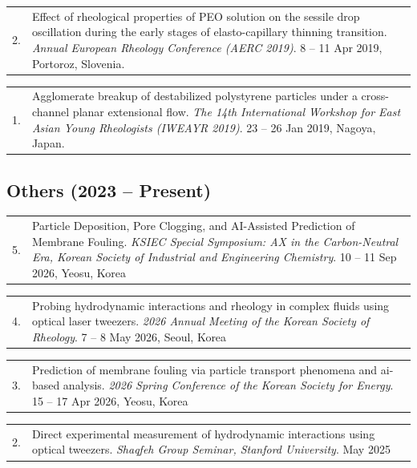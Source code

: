 \documentclass[11pt, a4paper]{article}
\makeatletter
\newenvironment{pubitem}[2]{%
  \begin{tabularx}{\textwidth}{@{}p{1cm}X@{}}
  #1 & #2 \\
  \end{tabularx}
}{}
\makeatother
\begin{document}
    \begin{pubitem}{2.}{Effect of rheological properties of PEO solution on the sessile drop oscillation during the early stages of elasto-capillary thinning transition. 
    \textit{Annual European Rheology Conference (AERC 2019)}. 8 – 11 Apr 2019, Portoroz, Slovenia.}
    \end{pubitem}
    
    \vspace{0.3em}
    
    \begin{pubitem}{1.}{Agglomerate breakup of destabilized polystyrene particles under a cross-channel planar extensional flow. 
    \textit{The 14th International Workshop for East Asian Young Rheologists (IWEAYR 2019)}. 23 – 26 Jan 2019, Nagoya, Japan.}
    \end{pubitem}

    \subsection{Others (2023 – Present)}

    \begin{pubitem}{5.}{Particle Deposition, Pore Clogging, and AI-Assisted Prediction of Membrane Fouling.
    \textit{KSIEC Special Symposium: AX in the Carbon-Neutral Era, Korean Society of Industrial and Engineering Chemistry}. 10 – 11 Sep 2026, Yeosu, Korea}
    \end{pubitem}

    \vspace{0.3em}

    \begin{pubitem}{4.}{Probing hydrodynamic interactions and rheology in complex fluids using optical laser tweezers.
    \textit{2026 Annual Meeting of the Korean Society of Rheology}. 7 – 8 May 2026, Seoul, Korea}
    \end{pubitem}

    \begin{pubitem}{3.}{Prediction of membrane fouling via particle transport phenomena and ai-based analysis. 
    \textit{2026 Spring Conference of the Korean Society for Energy}. 15 – 17 Apr 2026, Yeosu, Korea}
    \end{pubitem}
    
    \vspace{0.3em}
    \begin{pubitem}{2.}{Direct experimental measurement of hydrodynamic interactions using optical tweezers. 
    \textit{Shaqfeh Group Seminar, Stanford University}. May 2025}
    \end{pubitem}
    
\end{document}
